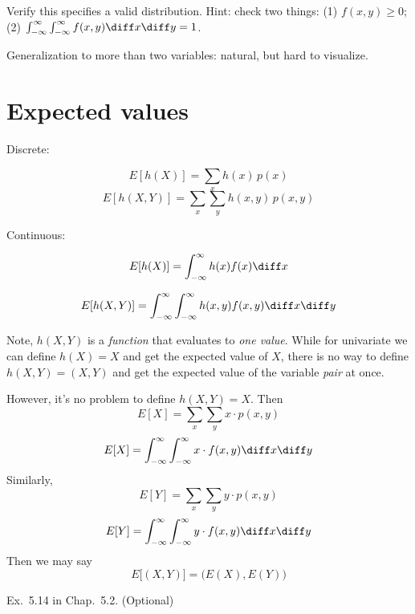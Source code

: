 \documentclass[12pt]{article}
\begin{document}
\exercise
Verify this specifies a valid distribution.
Hint: check two things:
(1) $f(x,y) \ge 0$;
(2) $\int_{-\infty}^{\infty} \int_{-\infty}^{\infty} f(x,y) \diff x\diff
y = 1$.

Generalization to more than two variables:
natural, but hard to visualize.

% 
% 
% 
% 
% 


\section{Expected values}

Discrete:

\[
E[h(X)] = \sum_x h(x) \, p(x)
\]
\[
E[h(X,Y)] = \sum_x \sum_y h(x,y) \, p(x,y)
\]

Continuous:

\[
E[h(X)] = \int_{-\infty}^{\infty} h(x) f(x) \diff x
\]

\[
E[h(X,Y)]
= \int_{-\infty}^{\infty} \int_{-\infty}^{\infty}
    h(x,y) f(x,y) \diff x \diff y
\]

Note, $h(X,Y)$ is a \emph{function} that evaluates to \emph{one value}.
While for univariate we can define $h(X) = X$ and get the expected value
of $X$, there is no way to define $h(X,Y) = (X,Y)$ and get the
expected value of the variable \emph{pair} at once.

However, it's no problem to define $h(X, Y) = X$.
Then
\[
E[X] = \sum_x \sum_y x\cdot p(x,y)
\]
\[
E[X] = \int_{-\infty}^{\infty} \int_{-\infty}^{\infty} x \cdot f(x,y) \diff x \diff y
\]
Similarly,
\[
E[Y] = \sum_x \sum_y y\cdot p(x,y)
\]
\[
E[Y] = \int_{-\infty}^{\infty} \int_{-\infty}^{\infty} y \cdot f(x,y) \diff x \diff y
\]
Then we may say
\[
E\bigl[(X, Y)\bigr]
= \bigl(E(X), E(Y)\bigr)
\]


\example Ex.~5.14 in Chap.~5.2. (Optional)

\end{document}

